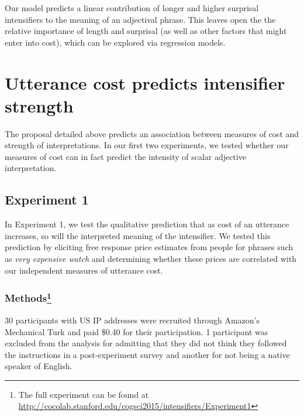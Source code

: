 \documentclass[10pt,letterpaper]{article}
\newcommand{\w}[1]{\emph{#1}}
\begin{document}
Our model predicts a linear contribution of longer and higher surprisal intensifiers to the meaning of an adjectival phrase. 
This leaves open the the relative importance of length and surprisal (as well as other factors that might enter into cost), which can be explored via regression models.

\section{Utterance cost predicts intensifier strength}
The proposal detailed above predicts an association between measures of cost and strength of interpretations. 
In our first two experiments, we tested whether our measures of cost can in fact predict the intensity of scalar adjective interpretation.

\subsection{Experiment 1}

In Experiment 1, we test the qualitative prediction that as cost of an utterance increases, so will the interpreted meaning of the intensifier.
We tested this prediction
by eliciting free response price estimates from people for phrases such as \w{very expensive watch} and determining whether these prices are correlated with our independent measures of utterance cost.

\subsubsection{Methods\footnote{The full experiment can be found at \url{http://cocolab.stanford.edu/cogsci2015/intensifiers/Experiment1}}}

30 participants with US IP addresses were recruited through Amazon's Mechanical Turk and paid \$0.40 for their participation. 1 participant was excluded from the analysis for admitting that they did not think they followed the instructions in a post-experiment survey and another for not being a native speaker of English.
\end{document}
